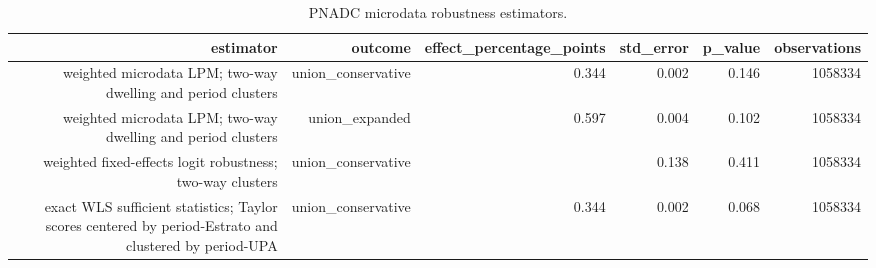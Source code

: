 \begin{table}[!htbp]
\centering
\caption{PNADC microdata robustness estimators.} 
\label{tab:union_microdata}
\begingroup\small
\begin{tabular}{rrrrrr}
  \hline
estimator & outcome & effect\_percentage\_points & std\_error & p\_value & observations \\ 
  \hline
weighted microdata LPM; two-way dwelling and period clusters & union\_conservative & 0.344 & 0.002 & 0.146 & 1058334 \\ 
  weighted microdata LPM; two-way dwelling and period clusters & union\_expanded & 0.597 & 0.004 & 0.102 & 1058334 \\ 
  weighted fixed-effects logit robustness; two-way clusters & union\_conservative &  & 0.138 & 0.411 & 1058334 \\ 
  exact WLS sufficient statistics; Taylor scores centered by period-Estrato and clustered by period-UPA & union\_conservative & 0.344 & 0.002 & 0.068 & 1058334 \\ 
   \hline
\end{tabular}
\endgroup
\end{table}
